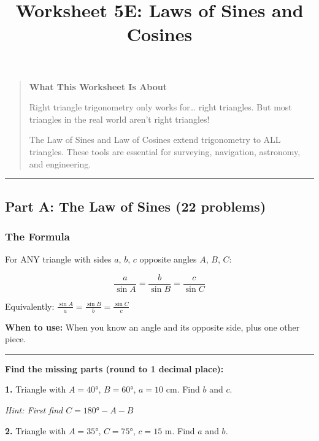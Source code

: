 \documentclass[
  11pt,
]{article}
\title{Worksheet 5E: Laws of Sines and Cosines}
\author{}
\date{}
\begin{document}
\maketitle

\begin{quote}
\textbf{What This Worksheet Is About}

Right triangle trigonometry only works for\ldots{} right triangles. But
most triangles in the real world aren't right triangles!

The Law of Sines and Law of Cosines extend trigonometry to ALL
triangles. These tools are essential for surveying, navigation,
astronomy, and engineering.
\end{quote}

\begin{center}\rule{0.5\linewidth}{0.5pt}\end{center}

\hypertarget{part-a-the-law-of-sines-22-problems}{%
\subsection{Part A: The Law of Sines (22
problems)}\label{part-a-the-law-of-sines-22-problems}}

\hypertarget{the-formula}{%
\subsubsection{The Formula}\label{the-formula}}

For ANY triangle with sides \(a\), \(b\), \(c\) opposite angles \(A\),
\(B\), \(C\):

\[\boxed{\frac{a}{\sin A} = \frac{b}{\sin B} = \frac{c}{\sin C}}\]

Equivalently: \(\frac{\sin A}{a} = \frac{\sin B}{b} = \frac{\sin C}{c}\)

\textbf{When to use:} When you know an angle and its opposite side, plus
one other piece.

\begin{center}\rule{0.5\linewidth}{0.5pt}\end{center}

\textbf{Find the missing parts (round to 1 decimal place):}

\textbf{1.} Triangle with \(A = 40°\), \(B = 60°\), \(a = 10\) cm. Find
\(b\) and \(c\).

\emph{Hint: First find \(C = 180° - A - B\)}

\textbf{2.} Triangle with \(A = 35°\), \(C = 75°\), \(c = 15\) m. Find
\(a\) and \(b\).
\end{document}
